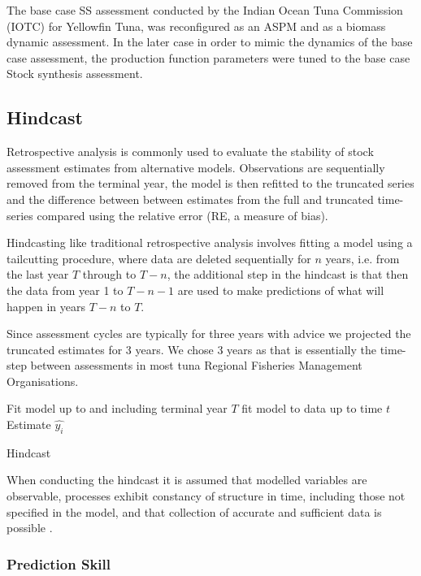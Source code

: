 \documentclass[12pt,halfline,a4paper,nonumbib]{ouparticle}
\begin{document}
The base case SS assessment conducted by the Indian Ocean Tuna Commission (IOTC) for Yellowfin Tuna, was reconfigured as an ASPM and as a biomass dynamic assessment. In the later case in order to mimic the dynamics of the base case assessment, the production function parameters were tuned to the base case Stock synthesis assessment. 

\subsection{Hindcast}

Retrospective analysis \parencite{hurtado2014looking} is commonly used to evaluate the stability of stock assessment estimates from alternative models. Observations are sequentially removed from the terminal year, the model is then refitted to the truncated series and the difference between between estimates from the full and truncated time-series compared using the relative error (RE, a measure of bias). 

Hindcasting like traditional retrospective analysis involves fitting a model using a tailcutting procedure, where data are deleted sequentially for $n$ years, i.e. from the last year $T$ through to $T−n$, the additional step in the hindcast is that then the data from year 1 to $T - n - 1$ are used to make predictions of what will happen in years $T - n$ to $T$.

Since assessment cycles are typically for three years  with advice \parencite{fricker2013three} we projected the truncated estimates for 3 years. We chose 3 years as that is essentially the time-step between assessments in most tuna Regional Fisheries Management Organisations.

\begin{algorithm}[!ht]
\begin{algorithmic}[1]
\State Fit model up to and including terminal year $T$
\State fit model to data up to time $t$  
\State Estimate $\hat{y_i}$
\EndFor
\EndFor
\caption{Hindcast}
\label{Hindcast}
\end{algorithmic}
\end{algorithm}

When conducting the hindcast it is assumed that modelled variables are observable, processes exhibit constancy of structure in time, including those not specified in the model, and that collection of accurate and sufficient data is possible \parencite{hodges1992you}.

\subsubsection{Prediction Skill}
\end{document}
